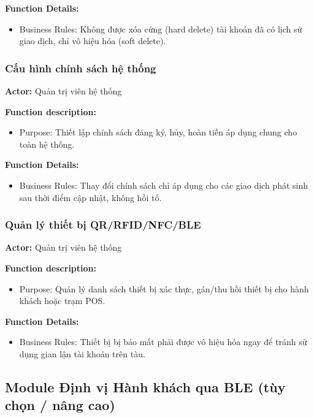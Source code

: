 \noindent\textbf{Function Details:}
\begin{itemize}
    \item Business Rules: Không được xóa cứng (hard delete) tài khoản đã có lịch sử giao dịch, chỉ vô hiệu hóa (soft delete).
\end{itemize}

\subsubsection{Cấu hình chính sách hệ thống}

\noindent\textbf{Actor:} Quản trị viên hệ thống

\noindent\textbf{Function description:}
\begin{itemize}
    \item Purpose: Thiết lập chính sách đăng ký, hủy, hoàn tiền áp dụng chung cho toàn hệ thống.
\end{itemize}

\noindent\textbf{Function Details:}
\begin{itemize}
    \item Business Rules: Thay đổi chính sách chỉ áp dụng cho các giao dịch phát sinh sau thời điểm cập nhật, không hồi tố.
\end{itemize}

\subsubsection{Quản lý thiết bị QR/RFID/NFC/BLE}

\noindent\textbf{Actor:} Quản trị viên hệ thống

\noindent\textbf{Function description:}
\begin{itemize}
    \item Purpose: Quản lý danh sách thiết bị xác thực, gán/thu hồi thiết bị cho hành khách hoặc trạm POS.
\end{itemize}

\noindent\textbf{Function Details:}
\begin{itemize}
    \item Business Rules: Thiết bị bị báo mất phải được vô hiệu hóa ngay để tránh sử dụng gian lận tài khoản trên tàu.
\end{itemize}


\subsection{Module Định vị Hành khách qua BLE (tùy chọn / nâng cao)}

